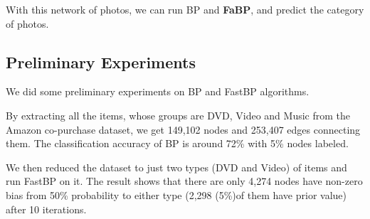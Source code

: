 With this network of photos, we can run BP and \textbf{FaBP}, and predict the category of photos.


 \subsection{Preliminary Experiments}
We did some preliminary experiments on BP and FastBP algorithms.

By extracting all the items, whose groups are DVD, Video and Music from the Amazon co-purchase dataset, we get 149,102 nodes and 253,407 edges connecting them.
The classification accuracy of BP is around 72\% with 5\% nodes labeled.

We then reduced the dataset to just two types (DVD and Video) of items and run FastBP on it.
The result shows that there are only 4,274 nodes have non-zero bias from 50\% probability to either type (2,298 (5\%)of them have prior value) after 10 iterations.
